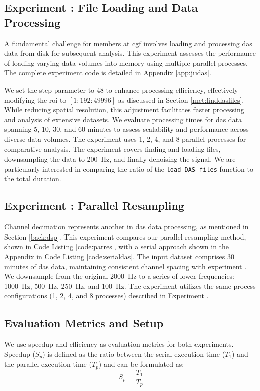 \subsection{Experiment : File Loading and Data Processing}
A fundamental challenge for members at \acrshort{cgf} involves loading and processing \acrshort{das} data from disk for subsequent analysis. This experiment assesses the performance of loading varying data volumes into memory using multiple parallel processes. The complete experiment code is detailed in Appendix \ref{app:judas}.

We set the step parameter to 48 to enhance processing efficiency, effectively modifying the \acrshort{roi} to $[1:192:49996]$ as discussed in Section \ref{met:finddasfiles}. While reducing spatial resolution, this adjustment facilitates faster processing and analysis of extensive datasets. We evaluate processing times for \acrshort{das} data spanning 5, 10, 30, and 60 minutes to assess scalability and performance across diverse data volumes. The experiment uses 1, 2, 4, and 8 parallel processes for comparative analysis. The experiment covers finding and loading files, downsampling the data to \qty{200}{\hertz}, and finally denoising the signal. We are particularly interested in comparing the ratio of the \lstinline{load_DAS_files} function to the total duration.

\subsection{Experiment : Parallel Resampling}
Channel decimation represents another in \acrshort{das} data processing, as mentioned in Section \ref{back:dsp}. This experiment compares our parallel resampling method, shown in Code Listing \ref{code:parres}, with a serial approach shown in the Appendix in Code Listing \ref{code:serialdas}. The input dataset comprises 30 minutes of \acrshort{das} data, maintaining consistent channel spacing with experiment . We downsample from the original \qty{2000}{\hertz} to a series of lower frequencies: \qty{1000}{\hertz}, \qty{500}{\hertz}, \qty{250}{\hertz}, and \qty{100}{\hertz}. The experiment utilizes the same process configurations (1, 2, 4, and 8 processes) described in Experiment .

\subsection{Evaluation Metrics and Setup}
We use speedup and efficiency as evaluation metrics for both experiments. Speedup ($S_p$) is defined as the ratio between the serial execution time ($T_1$) and the parallel execution time ($T_p$) and can be formulated as:
\begin{equation}
    S_p = \frac{T_1}{T_p}
\end{equation}

